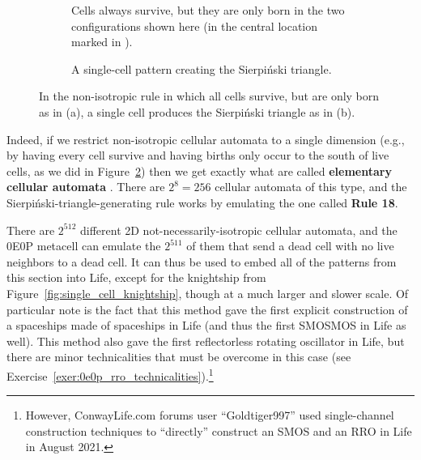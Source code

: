 \begin{figure}[!htb]
	\centering
	\begin{subfigure}{.42\textwidth}
		\centering
		\caption{Cells always survive, but they are only born in the two configurations shown here (in the central location marked in ).}
		\label{fig:non_iso_rule_18}
	\end{subfigure} \hfill \begin{subfigure}{.53\textwidth}
		\centering
		\caption{A single-cell pattern creating the Sierpi\'{n}ski triangle.}
		\label{fig:single_cell_sierpinski}
	\end{subfigure}
	\caption{In the non-isotropic rule in which all cells survive, but are only born as in (a), a single cell produces the Sierpi\'{n}ski triangle as in (b).}\label{fig:single_cell_weird}
\end{figure}

Indeed, if we restrict non-isotropic cellular automata to a single dimension (e.g., by having every cell survive and having births only occur to the south of live cells, as we did in Figure~\ref{fig:single_cell_sierpinski}) then we get exactly what are called \textbf{elementary cellular automata} \cite{Wolfram2002}. There are $2^8 = 256$ cellular automata of this type, and the Sierpi\'{n}ski-triangle-generating rule works by emulating the one called \textbf{Rule 18}.

There are $2^{512}$ different 2D not-necessarily-isotropic cellular automata, and the 0E0P metacell can emulate the $2^{511}$ of them that send a dead cell with no live neighbors to a dead cell. It can thus be used to embed all of the patterns from this section into Life, except for the knightship from Figure~\ref{fig:single_cell_knightship}, though at a much larger and slower scale. Of particular note is the fact that this method gave the first explicit construction of a spaceships made of spaceships in Life (and thus the first SMOSMOS in Life as well). This method also gave the first reflectorless rotating oscillator in Life, but there are minor technicalities that must be overcome in this case (see Exercise~\ref{exer:0e0p_rro_technicalities}).\footnote{However, ConwayLife.com forums user ``Goldtiger997'' used single-channel construction techniques to ``directly'' construct an SMOS and an RRO in Life in August 2021.}


